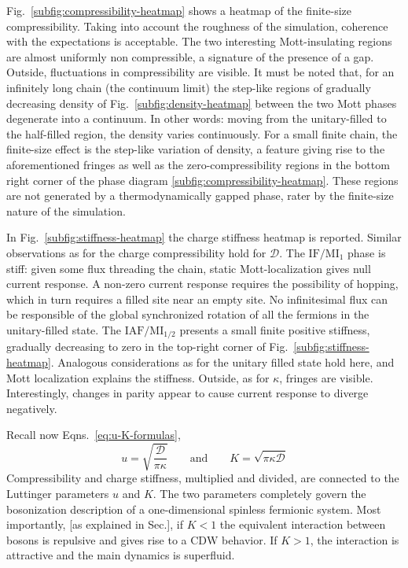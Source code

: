 Fig.~\ref{subfig:compressibility-heatmap} shows a heatmap of the finite-size compressibility. Taking into account the roughness of the simulation, coherence with the expectations is acceptable. The two interesting Mott-insulating regions are almost uniformly non compressible, a signature of the presence of a gap. Outside, fluctuations in compressibility are visible. It must be noted that, for an infinitely long chain (the continuum limit) the step-like regions of gradually decreasing density of Fig.~\ref{subfig:density-heatmap} between the two Mott phases degenerate into a continuum. In other words: moving from the unitary-filled to the half-filled region, the density varies continuously. For a small finite chain, the finite-size effect is the step-like variation of density, a feature giving rise to the aforementioned fringes as well as the zero-compressibility regions in the bottom right corner of the phase diagram \ref{subfig:compressibility-heatmap}. These regions are not generated by a thermodynamically gapped phase, rater by the finite-size nature of the simulation.

In Fig.~\ref{subfig:stiffness-heatmap} the charge stiffness heatmap is reported. Similar observations as for the charge compressibility hold for $\mathcal{D}$. The $\mathrm{IF}/\mathrm{MI}_1$ phase is stiff: given some flux threading the chain, static Mott-localization gives null current response. A non-zero current response requires the possibility of hopping, which in turn requires a filled site near an empty site. No infinitesimal flux can be responsible of the global synchronized rotation of all the fermions in the unitary-filled state.
The $\mathrm{IAF}/\mathrm{MI}_{1/2}$ presents a small finite positive stiffness, gradually decreasing to zero in the top-right corner of Fig.~\ref{subfig:stiffness-heatmap}. Analogous considerations as for the unitary filled state hold here, and Mott localization explains the stiffness. Outside, as for $\kappa$, fringes are visible. Interestingly, changes in parity appear to cause current response to diverge negatively.

Recall now Eqns.~\eqref{eq:u-K-formulas},
\[
	u = \sqrt{\frac{\mathcal{D}}{\pi\kappa}}
	\qquad\text{and}\qquad
	K = \sqrt{\pi\kappa\mathcal{D}}
\]
Compressibility and charge stiffness, multiplied and divided, are connected to the Luttinger parameters $u$ and $K$. The two parameters completely govern the bosonization description of a one-dimensional spinless fermionic system. Most importantly, {\color{tabred} [as explained in Sec.]}, if $K < 1$ the equivalent interaction between bosons is repulsive and gives rise to a $\mathrm{CDW}$ behavior. If $K > 1$, the interaction is attractive and the main dynamics is superfluid.

